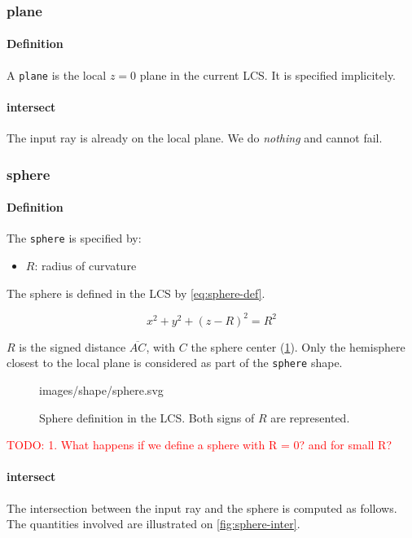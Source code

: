 \subsubsection{plane}
\paragraph{Definition}
A \lstinline{plane} is the local $z=0$ plane in the current \gls{LCS}.
It is specified implicitely.

\paragraph{intersect}
The input ray is already on the local plane. We do \emph{nothing} and cannot
fail.

\subsubsection{sphere}

\paragraph{Definition}
The \lstinline{sphere} is specified by:

\begin{itemize}
\item $R$: radius of curvature
\end{itemize}

The sphere is defined in the \gls{LCS} by \cref{eq:sphere-def}.

\begin{equation} \label{eq:sphere-def}
x^2 + y^2 + (z - R)^2 = R^2
\end{equation}

$R$ is the signed distance $\overline{AC}$, with $C$ the sphere center
(\cref{fig:sphere-def-lcs}). Only the hemisphere closest to the local plane
is considered as part of the \lstinline{sphere} shape.

\begin{figure} \caption{\label{fig:sphere-def-lcs} Sphere definition
in the LCS. Both signs of $R$ are represented.}

           {images/shape/sphere.svg}
\end{figure}

\textcolor{red}{TODO:
1. What happens if we define a sphere with R = 0? and for small R?
}

\paragraph{intersect}
The intersection between the input ray and the sphere is computed as
follows. The quantities involved are illustrated on \cref{fig:sphere-inter}.

